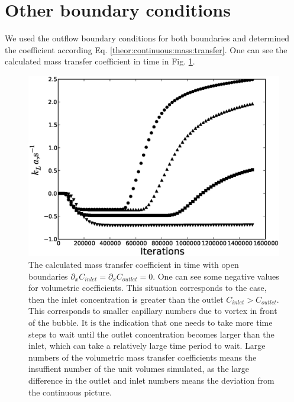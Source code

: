 \documentclass{article}
\begin{document}
\section{Other boundary conditions}
We used the outflow boundary conditions for both boundaries and determined the coefficient
according Eq. \ref{theor:continuous:mass:transfer}. One can see the calculated mass transfer
coefficient in time in Fig. \ref{fig:steady:state:jos}.
\begin{figure}[htb!]
\includegraphics[width=\textwidth]{Figures/steady_state_jos.eps}
\caption{The calculated mass transfer coefficient in time with open boundaries $\partial_x
C_{inlet}=\partial_x C_{outlet}=0$. One can see some negative values for volumetric coefficients.
This situation corresponds to the case, then the inlet concentration is greater than the outlet
$C_{inlet}>C_{outlet}$. This corresponds to smaller capillary numbers due to vortex in front of the
bubble. It is the indication that one needs to take more time steps to wait until the outlet
concentration becomes larger than the inlet, which can take a relatively large time period to
wait. Large numbers of the volumetric mass transfer coefficients means the insuffient number of
the unit volumes simulated, as the large difference in the outlet and inlet numbers means the
deviation from the continuous picture. \label{fig:steady:state:jos} }
\end{figure}
\end{document}

